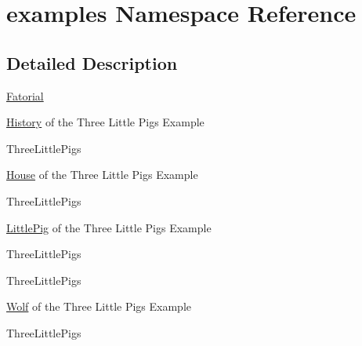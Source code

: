 \hypertarget{namespaceexamples}{
\section{examples Namespace Reference}
\label{namespaceexamples}
}


\subsection{Detailed Description}
\hyperlink{class_fatorial}{Fatorial}

\hyperlink{class_history}{History} of the Three Little Pigs Example

ThreeLittlePigs

\hyperlink{class_house}{House} of the Three Little Pigs Example

ThreeLittlePigs

\hyperlink{class_little_pig}{LittlePig} of the Three Little Pigs Example

ThreeLittlePigs

ThreeLittlePigs

\hyperlink{class_wolf}{Wolf} of the Three Little Pigs Example

ThreeLittlePigs 


